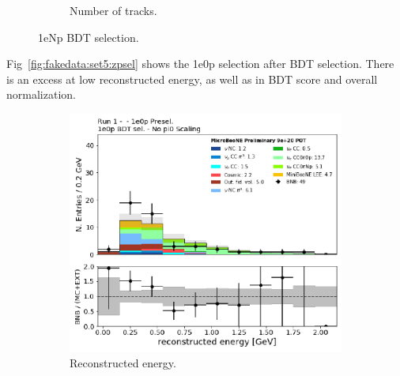 \begin{figure}[H]
\begin{center}
\begin{subfigure}[b]{0.45\textwidth}
    \caption{\label{fig:fakedata:set5:Np_postsel_ntracks} Number of tracks.}
    \end{subfigure}
\caption{\label{fig:fakedata:set5:npsel} 1eNp BDT selection.}
\end{center}
\end{figure}

Fig~\ref{fig:fakedata:set5:zpsel} shows the 1e0p selection after BDT selection.  There is an excess at low reconstructed energy, as well as in BDT score and overall normalization.

\begin{figure}[H] 
\begin{center}
    \begin{subfigure}[b]{0.3\textwidth}
    \centering
    \includegraphics[width=1.00\textwidth]{Fakedata/set5/zp_postsel_recoe.pdf}
    \caption{\label{fig:fakedata:set5:zp_postsel_recoe} Reconstructed energy.}
    \end{subfigure}
    \begin{subfigure}[b]{0.3\textwidth}
    \centering

\end{subfigure}
\end{center}
\end{figure}
